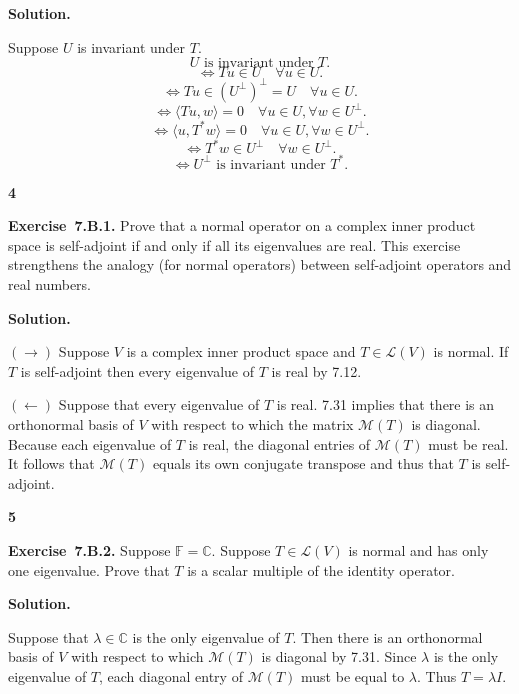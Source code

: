 \documentclass[11pt]{article}
\newcommand{\ProblemDivider}[1]{%
  \vspace{1.0em}
  \noindent\textbf{#1}\par
  \vspace{0.35em}
}
\newcommand{\ProblemAnnounce}{\noindent}
\newcommand{\SolutionAnnounce}{\noindent\textbf{Solution.}\par\medskip}
\newcommand{\Exercise}[1]{\textbf{Exercise~#1.}\;}
\newcommand{\C}{\mathbb{C}}
\newcommand{\F}{\mathbb{F}}
\newcommand{\LL}{\mathcal{L}}
\begin{document}
\begin{solutionBox}
\SolutionAnnounce
\doublespacing

Suppose $U$ is invariant under $T$.
\[
U \text{ is invariant under } T.
\]
\[
\Longleftrightarrow Tu \in U \quad \forall u \in U.
\]
\[
\Longleftrightarrow Tu \in (U^\perp)^\perp = U \quad \forall u \in U.
\]
\[
\Longleftrightarrow \langle Tu, w\rangle = 0 \quad \forall u \in U, \forall w \in U^\perp.
\]
\[
\Longleftrightarrow \langle u, T^*w\rangle = 0 \quad \forall u \in U, \forall w \in U^\perp.
\]
\[
\Longleftrightarrow T^*w \in U^\perp \quad \forall w \in U^\perp.
\]
\[
\Longleftrightarrow U^\perp \text{ is invariant under } T^*.
\]

\end{solutionBox}

\ProblemDivider{4}

\begin{problemBox}
\ProblemAnnounce
\Exercise{7.B.1}
Prove that a normal operator on a complex inner product space is self-adjoint if and only if all its eigenvalues are real. This exercise strengthens the analogy (for normal operators) between self-adjoint operators and real numbers.
\end{problemBox}

\begin{solutionBox}
\SolutionAnnounce
\doublespacing

$(\rightarrow)$ Suppose $V$ is a complex inner product space and $T \in \LL(V)$ is normal. If $T$ is self-adjoint then every eigenvalue of $T$ is real by 7.12.

$(\leftarrow)$ Suppose that every eigenvalue of $T$ is real. 7.31 implies that there is an orthonormal basis of $V$ with respect to which the matrix $\mathcal{M}(T)$ is diagonal. Because each eigenvalue of $T$ is real, the diagonal entries of $\mathcal{M}(T)$ must be real. It follows that $\mathcal{M}(T)$ equals its own conjugate transpose and thus that $T$ is self-adjoint.

\end{solutionBox}

\ProblemDivider{5}

\begin{problemBox}
\ProblemAnnounce
\Exercise{7.B.2}
Suppose $\F = \C$. Suppose $T \in \LL(V)$ is normal and has only one eigenvalue. Prove that $T$ is a scalar multiple of the identity operator.
\end{problemBox}

\begin{solutionBox}
\SolutionAnnounce
\doublespacing

Suppose that $\lambda \in \C$ is the only eigenvalue of $T$. Then there is an orthonormal basis of $V$ with respect to which $\mathcal{M}(T)$ is diagonal by 7.31. Since $\lambda$ is the only eigenvalue of $T$, each diagonal entry of $\mathcal{M}(T)$ must be equal to $\lambda$. Thus $T = \lambda I$.

\end{solutionBox}
\end{document}
